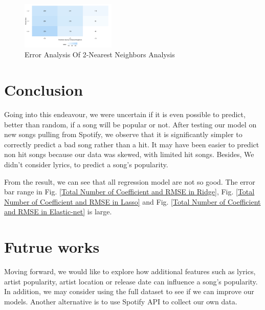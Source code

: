 \documentclass[conference]{IEEEtran}
\begin{document}
\begin{figure}[htbp]
\centerline{\includegraphics[width=0.4\textwidth]{figure/errorK-NearestNeighbors.png}}
\caption{Error Analysis Of 2-Nearest Neighbors Analysis}
\label{errorK-NearestNeighbors}
\end{figure}



\section{Conclusion}
Going into this endeavour, we were uncertain if it is even possible to predict, better than random, if a song will be popular or not. After testing our model on new songs pulling from Spotify, we observe that it is significantly simpler to correctly predict a bad song rather than a hit. It may have been easier to predict non hit songs because our data was skewed, with limited hit songs. Besides, We didn't consider lyrics,  to predict a song’s popularity.

From the result, we can see that all regression model are not so good. The error bar range in Fig. \ref{Total Number of Coefficient and RMSE in Ridge}, Fig. \ref{Total Number of Coefficient and RMSE in Lasso} and Fig. \ref{Total Number of Coefficient and RMSE in Elastic-net} is large. 

\section{Futrue works}
Moving forward, we would like to explore how additional features such as lyrics, artist popularity, artist location or release date can influence a song’s popularity. In addition, we may consider using the full dataset to see if we can improve our models. Another alternative is to use Spotify API to collect our own data.


\end{document}
